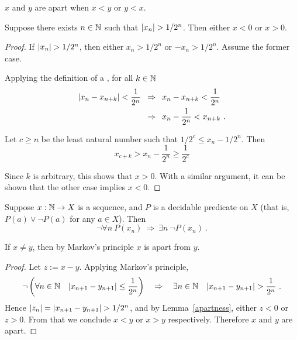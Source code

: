 \documentclass[leqno]{report}
\begin{document}
\begin{Definition}[Apartness]
    $x$ and $y$ are apart when $x < y$ or $y < x$.
\end{Definition}

\begin{Lemma} \label{apartness}
    Suppose there exists $n \in \mathbb{N}$ such that $\left| x_n \right| > 1/2^n$.
    Then either $x < 0$ or $x > 0$.
\end{Lemma}

\begin{proof}
    If $\left| x_n \right| > 1/2^n$, then either $x_n > 1/2^n$ or $-x_n > 1/2^n$. Assume the former case.

    Applying the definition of a \FCCS, for all $k \in \mathbb{N}$
    \begin{align*}
        \left| x_n - x_{n+k} \right| < \frac{1}{2^n}
        \enspace&\Rightarrow\enspace x_n - x_{n+k} < \frac{1}{2^n} \\
        \enspace&\Rightarrow\enspace x_n - \frac{1}{2^n} < x_{n+k} \ .
    \end{align*}

    Let $c \geq n$ be the least natural number such that $1/2^c \leq x_n - 1/2^n$. Then
    \[ x_{c+k} > x_n - \frac{1}{2^n} \geq \frac{1}{2^c} \]

    Since $k$ is arbitrary, this shows that $x > 0$. With a similar argument, it can be shown that the other case implies $x < 0$.
\end{proof}

\begin{Definition}
    Suppose $x : \mathbb{N} \rightarrow X$ is a sequence, and $P$ is a decidable predicate on $X$ (that is, $P(a) \vee \neg P(a)$ for any $a \in X$). Then
    \[
        \neg \forall n\ P(x_n)
        \ \Rightarrow\ \exists n\ \neg P(x_n) \ .
    \]
\end{Definition}

\begin{Proposition}[Apartness]
    If $x \neq y$, then by Markov's principle $x$ is apart from $y$.
\end{Proposition}

\begin{proof}
    Let $z := x - y$. Applying Markov's principle,
    \[
        \neg \left( \fa{n \in \N}{\abs{x_{n+1} - y_{n+1}} \leq \frac{1}{2^n}} \right)
        \quad \Rightarrow \quad
        \ex{n \in \N}{\abs{x_{n+1} - y_{n+1}} > \frac{1}{2^n}} \ .
    \]
    Hence $\left| z_n \right| = \left| x_{n+1} - y_{n+1} \right| > 1/2^n$, and by Lemma~\ref{apartness}, either $z < 0$ or $z > 0$. From that we conclude $x < y$ or $x > y$ respectively. Therefore $x$ and $y$ are apart.
\end{proof}
\end{document}

